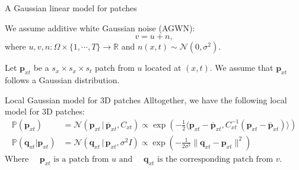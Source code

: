 \documentclass[mathserif, 8pt]{beamer}
\newcommand{\ma}[1]{\boldsymbol{#1}}
\begin{document}
\begin{frame}{A Gaussian linear model for patches}

	 We assume additive white Gaussian noise (AGWN):
	\[v = u + n,\]
	where $u,v,n:\Omega\times \{1,\cdots,T\}\rightarrow\mathds R$ and $n(x,t)\sim \mathcal N(0,\sigma^2)$.

	\bigskip                        

	\pause

	 Let $\ma p_{xt}$ be a
	$s_x\times s_x\times s_t$ patch from $u$ located at $(x,t)$. 
	We assume that $\ma p_{xt}$ follows a Gaussian distribution.



	\bigskip

	\pause

	\begin{block}{Local Gaussian model for 3D patches}
	Alltogether, we have the following local model for 3D patches:
	\begin{align*}
		\mathds{P}(\ma p_{xt}) &= \mathcal N(\ma p_{xt}\,|\,\overline {\ma p}_{xt}, C_{xt}) 
		                   \propto \exp\left(-\frac12\langle \ma p_{xt} - \overline{\ma p}_{xt}, 
		                                C_{xt}^{-1}(\ma p_{xt} - \overline{\ma p}_{xt})\rangle\right)\\
		\mathds{P}(\ma q_{xt}|\ma p_{xt}) &= \mathcal N(\ma q_{xt}\,|\,\ma p_{xt}, \sigma^2 I) 
		             \propto \exp\left(-\frac1{2\sigma^2}\|\ma q_{xt} - \ma p_{xt}\|^2\right)
	\end{align*}
	Where 
	$
		\quad \ma p_{xt}  \,\, \text{is a patch from } u \text{ and }
		\quad \ma q_{xt}  \,\, \text{is the corresponding patch from } v.
	$
	\end{block}

\end{frame}
\end{document}
